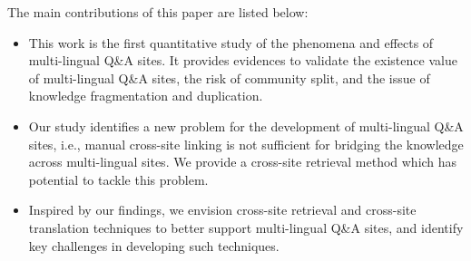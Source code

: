     

The main contributions of this paper are listed below:	
\begin{itemize}
	\item This work is the first quantitative study of the phenomena and effects of multi-lingual Q\&A sites. 
	It provides evidences to validate the existence value of multi-lingual Q\&A sites, the risk of community split, and the issue of knowledge fragmentation and duplication. 
	\item Our study identifies a new problem for the development of multi-lingual Q\&A sites, i.e., manual cross-site linking is not sufficient for bridging the knowledge across multi-lingual sites. We provide a cross-site retrieval method which has potential to tackle this problem. 
	\item Inspired by our findings, we envision cross-site retrieval and cross-site translation techniques to better support multi-lingual Q\&A sites, and identify key challenges in developing such techniques.
\end{itemize}

